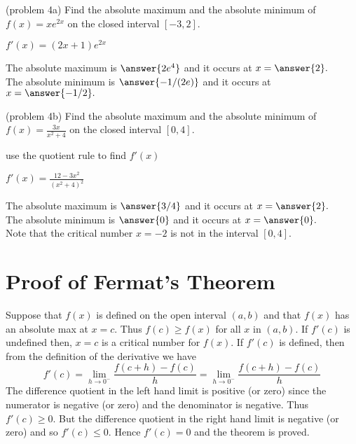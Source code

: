 \documentclass[handout]{ximera}
\begin{document}
\begin{problem}(problem 4a)
Find the absolute maximum and the absolute minimum of $f(x) = xe^{2x}$
on the closed interval $[-3, 2]$.
\begin{hint}
$f'(x) = (2x+1)e^{2x}$
\end{hint}

The absolute maximum is $\answer{2e^4}$ and it occurs at $x = \answer{2}.$\\
The absolute minimum is $\answer{-1/(2e)}$ and it occurs at $x = \answer{-1/2}.$ 
\end{problem}

\begin{problem}(problem 4b)
Find the absolute maximum and the absolute minimum of $f(x) = \frac{3x}{x^2+4}$
on the closed interval $[0, 4]$.

\begin{hint}
use the quotient rule to find $f'(x)$
\end{hint}
\begin{hint}
$f'(x) = \frac{12-3x^2}{(x^2+4)^2}$
\end{hint}

The absolute maximum is $\answer{3/4}$ and it occurs at $x = \answer{2}.$\\
The absolute minimum is $\answer{0}$ and it occurs at $x = \answer{0}.$\\
Note that the critical number $x= -2$ is not in the interval $[0, 4]$. 
\end{problem}


\begin{center}
\begin{foldable}
\end{foldable}
\end{center}


\section{Proof of Fermat's Theorem}
Suppose that $f(x)$ is defined on the open interval $(a,b)$ and that $f(x)$ has an absolute max at $x=c$.
Thus $f(c) \geq f(x)$ for all $x$ in $(a,b)$. If $f'(c)$ is undefined then, $x=c$ is a critical number for $f(x)$.
If $f'(c)$ is defined, then from the definition of the derivative we have
\[
f'(c) = \lim_{h \to 0^-} \frac{f(c+h) -f(c)}{h} = \lim_{h \to 0^-} \frac{f(c+h) -f(c)}{h}
\]
The difference quotient in the left hand limit is positive (or zero) since the numerator is negative (or zero) and the denominator is negative.
Thus $f'(c) \geq 0$.  But the difference quotient in the right hand limit is negative (or zero) and so $f'(c) \leq 0$.
Hence $f'(c) = 0$ and the theorem is proved.
\end{document}
